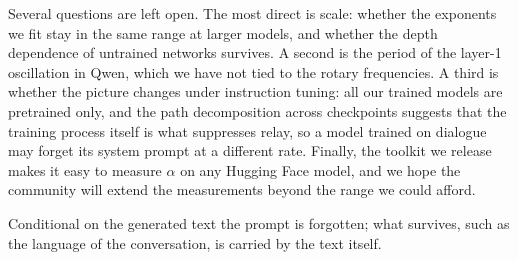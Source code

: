 \documentclass[11pt]{article}
\theoremstyle{definition}
\theoremstyle{remark}
\begin{document}
Several questions are left open. The most direct is scale: whether the exponents we fit stay in the same range at larger models, and whether the depth dependence of untrained networks survives. A second is the period of the layer-1 oscillation in Qwen, which we have not tied to the rotary frequencies. A third is whether the picture changes under instruction tuning: all our trained models are pretrained only, and the path decomposition across checkpoints suggests that the training process itself is what suppresses relay, so a model trained on dialogue may forget its system prompt at a different rate. Finally, the toolkit we release makes it easy to measure $\alpha$ on any Hugging Face model, and we hope the community will extend the measurements beyond the range we could afford.

Conditional on the generated text the prompt is forgotten; what survives, such as the language of the conversation, is carried by the text itself.
\end{document}
